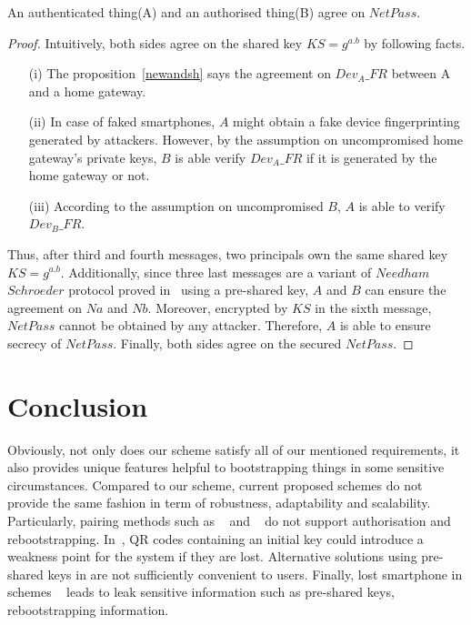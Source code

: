 \begin{Proposition}
An authenticated thing(A) and an authorised thing(B) agree on $NetPass$. 
\end{Proposition}

\begin{proof}

Intuitively, both sides agree on the shared key $KS = g^{a.b}$ by following facts. 
\begin{enumerate}
\item [(i)] The proposition~\ref{newandsh} says the agreement on $Dev_{A}\_FR$ between A and a home gateway.
\item [(ii)] In case of faked smartphones, $A$ might obtain a fake device fingerprinting generated by attackers. However, by the assumption on uncompromised home gateway's private keys, $B$ is able verify $Dev_{A}\_FR$ if it is generated by the home gateway or not. 
\item [(iii)] According to the assumption on uncompromised $B$, $A$ is able to verify $Dev_{B}\_FR$. 
\end{enumerate}

Thus, after third and fourth messages, two principals own the same shared key $KS = g^{a.b}$. Additionally, since three last messages are a variant of $Needham$ $Schroeder$ protocol proved in~\cite{674832} using a pre-shared key, $A$ and $B$ can ensure the agreement on $Na$ and $Nb$. 
Moreover, encrypted by $KS$ in the sixth message, $NetPass$ cannot be obtained by any attacker. Therefore, $A$ is able to ensure secrecy of $NetPass$. Finally, both sides agree on the secured $NetPass$. 
\end{proof}

\section{Conclusion}\label{conclusion}

Obviously, not only does our scheme satisfy all of our mentioned requirements, it also provides unique features helpful to bootstrapping things in some sensitive circumstances. Compared to our scheme, current proposed schemes do not provide the same fashion in term of robustness, adaptability and scalability. Particularly, pairing methods such as ~\cite{4159919} and ~\cite{5654588} do not support authorisation and rebootstrapping. In~\cite{Seung2015, Jeanning2013}, QR codes containing an initial key could introduce a weakness point for the system if they are lost. Alternative solutions using pre-shared keys in \cite{JCMjcm0708634642, Cha:2011:LSE:1968613.1968679, Ikram:2009:SLA:1582379.1582583, 6263790, rfc5191} are not sufficiently convenient to users. Finally, lost smartphone in schemes ~\cite{Seung2015, 6934398} leads to leak sensitive information such as pre-shared keys, rebootstrapping information.

